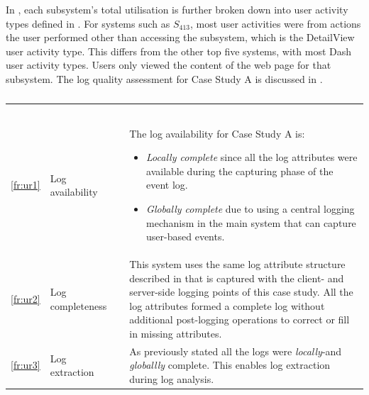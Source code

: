 In , each subsystem's total utilisation is further broken down into user activity types defined in . For systems such as $S_{413}$, most user activities were from actions the user performed other than accessing the subsystem, which is the DetailView user activity type. This differs from the other top five systems, with most Dash user activity types. Users only viewed the content of the web page for that subsystem. The log quality assessment for Case Study A is discussed in .

\begin{xltabular}{\textwidth}{clcX}
	\caption[Logging quality assessment of Case Study A]{\textit{Logging quality assessment of the test system}}\label{tbl:ch3_caseAQuality}\\
	\toprule
	 &  &  &  \\
	\midrule
	\endfirsthead

	\caption[]{\continueCaption} \\
	\toprule
	 &  &  &  \\
	\midrule
	\endhead

	\midrule
	 \\ 
	\endfoot
	\endlastfoot

	\ref{fr:ur1} & Log availability & \cmark & \RaggedRight The log availability for Case Study A is:
		\begin{itemize}
			\item \textit{Locally complete} since all the log attributes were available during the capturing phase of the event log. 
			\item \textit{Globally complete} due to using a central logging mechanism in the main system that can capture user-based events.  
		\end{itemize} \\
	\ref{fr:ur2} & Log completeness & \cmark & This system uses the same log attribute structure described in  that is captured with the client- and server-side logging points of this case study. All the log attributes formed a complete log without additional post-logging operations to correct or fill in missing attributes. \\
	\ref{fr:ur3} & Log extraction & \cmark & As previously stated all the logs were \textit{locally}-and \textit{globallly} complete. This enables log extraction during log analysis. \\
	\bottomrule
\end{xltabular}

